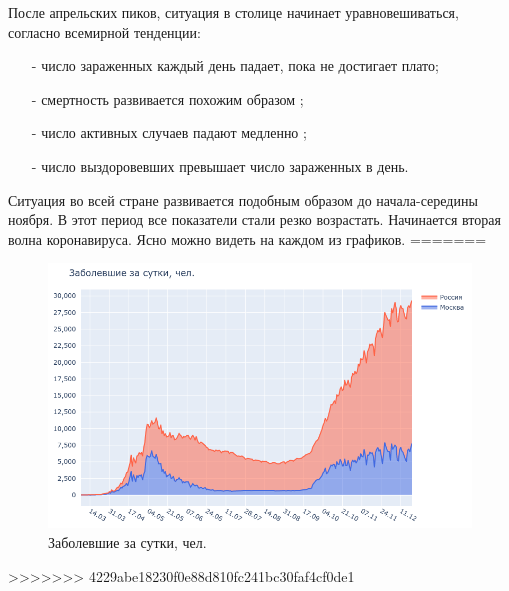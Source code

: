 \documentclass[a4paper, 12pt]{extarticle}
\begin{document}
После апрельских пиков, ситуация в столице начинает уравновешиваться, согласно
всемирной тенденции:
\begin{itemize}
    \item[-] число зараженных каждый день падает, пока не достигает плато;
    \item[-] смертность развивается похожим
        образом ;
    \item[-] число активных случаев падают медленно ;
    \item[-] число выздоровевших превышает число зараженных в день.
\end{itemize}

Ситуация во всей стране развивается подобным образом до начала-середины ноября.
В этот период все показатели стали резко возрастать. Начинается вторая волна
коронавируса. Ясно можно видеть на каждом из графиков.
=======
\begin{figure}[h]
    \centering
    \includegraphics[scale=0.55]{../plots/1day_confirmed_russia_moscow.png}
    \caption{Заболевшие за сутки, чел.} \label{fig:day_confirmed_russia_moscow}
\end{figure}

>>>>>>> 4229abe18230f0e88d810fc241bc30faf4cf0de1

\newpage

{}

\end{document}
